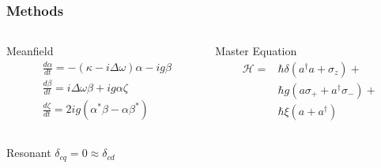 \documentclass[xetex]{beamer}
\begin{document}
\begin{frame}
    \frametitle{Methods}
    \begin{columns}[T]
        \begin{column}{0.5\linewidth}
            \begin{block}{Meanfield}
\begin{align}
&\frac{d \alpha}{dt} = -(\kappa -i \Delta \omega) \alpha-ig \beta\\ 
&\frac{d \beta}{dt} = i \Delta \omega \beta +ig \alpha \zeta\\ 
&\frac{d \zeta}{dt} = 2 i g(\alpha^* \beta -\alpha \beta^*)
\end{align}
            \end{block}
        \end{column}
        \begin{column}{0.5\linewidth}
            \begin{block}{Master Equation}
\begin{align} 
    \mathscr{H} = &\hbar \delta (a^\dagger a + 
    \sigma_z) + \\ \nonumber
    &\hbar g ( a \sigma_+ + a^\dagger \sigma_- ) + \\ \nonumber
    &\hbar \xi (a + a^\dagger) 
\end{align}
            \end{block}
        \end{column}
    \end{columns}
\end{frame}
\begin{frame}
    \begin{block}{Resonant}
        $
        \delta_{cq} = 0 \approx \delta_{cd}
        $
    \end{block}
\end{frame}
\end{document}
